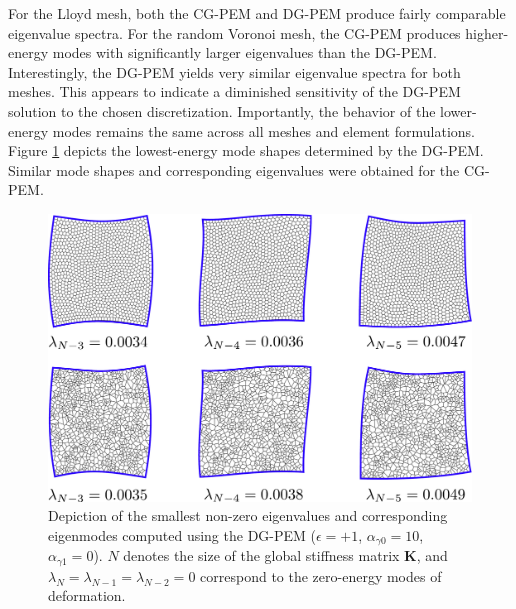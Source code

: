 For the Lloyd mesh, both the CG-PEM and DG-PEM produce fairly comparable eigenvalue spectra. For the random Voronoi mesh, the CG-PEM produces higher-energy modes with significantly larger eigenvalues than the DG-PEM. Interestingly, the DG-PEM yields very similar eigenvalue spectra for both meshes. This appears to indicate a diminished sensitivity of the DG-PEM solution to the chosen discretization. Importantly, the behavior of the lower-energy modes remains the same across all meshes and element formulations. Figure \ref{fig:patch_eigenmodes_DGPEM} depicts the lowest-energy mode shapes determined by the DG-PEM. Similar mode shapes and corresponding eigenvalues were obtained for the CG-PEM.
\begin{figure}[!h]
  \centering
  \includegraphics[width=5.0in]{figures/patch_eigenmodes_DGPEM.pdf}  \caption{Depiction of the smallest non-zero eigenvalues and corresponding eigenmodes computed using the DG-PEM ($\epsilon = +1$, $\alpha_{\gamma0} = 10$, $\alpha_{\gamma1} = 0$). $N$ denotes the size of the global stiffness matrix $\bm{K}$, and $\lambda_{N} = \lambda_{N-1} = \lambda_{N-2} = 0$ correspond to the zero-energy modes of deformation.}
  \label{fig:patch_eigenmodes_DGPEM}
\end{figure}

